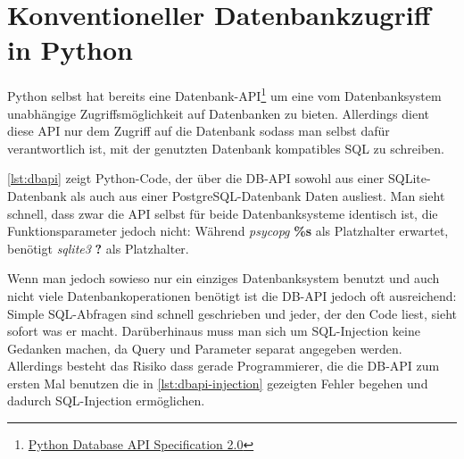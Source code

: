 \section{Konventioneller Datenbankzugriff in Python}

Python selbst hat bereits eine
Datenbank-API\footnote{\href{http://www.python.org/dev/peps/pep-0249/}{Python
Database API Specification 2.0}} um eine vom Datenbanksystem unabhängige
Zugriffsmöglichkeit auf Datenbanken zu bieten.
Allerdings dient diese API nur dem Zugriff auf die Datenbank sodass man selbst
dafür verantwortlich ist, mit der genutzten Datenbank kompatibles SQL zu
schreiben.

\autoref{lst:dbapi} zeigt Python-Code, der über die DB-API sowohl aus
einer SQLite-Datenbank als auch aus einer PostgreSQL-Datenbank Daten ausliest.
Man sieht schnell, dass zwar die API selbst für beide Datenbanksysteme identisch
ist, die Funktionsparameter jedoch nicht: Während \emph{psycopg} \textbf{\%s}
als Platzhalter erwartet, benötigt \emph{sqlite3} \textbf{?} als Platzhalter.



Wenn man jedoch sowieso nur ein einziges Datenbanksystem benutzt und auch nicht
viele Datenbankoperationen benötigt ist die DB-API jedoch oft ausreichend:
Simple SQL-Abfragen sind schnell geschrieben und jeder, der den Code liest,
sieht sofort was er macht. Darüberhinaus muss man sich um SQL-Injection keine
Gedanken machen, da Query und Parameter separat angegeben werden. Allerdings
besteht das Risiko dass gerade Programmierer, die die DB-API zum ersten Mal
benutzen die in \autoref{lst:dbapi-injection} gezeigten Fehler begehen und
dadurch SQL-Injection ermöglichen.


